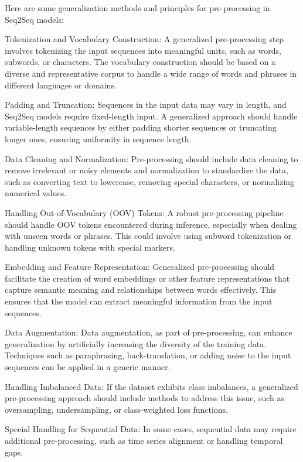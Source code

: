 \documentclass[conference]{IEEEtran}
\begin{document}
Here are some generalization methods and principles for pre-processing in Seq2Seq models:

    Tokenization and Vocabulary Construction: A generalized pre-processing step involves tokenizing the input sequences into meaningful units, such as words, subwords, or characters. The vocabulary construction should be based on a diverse and representative corpus to handle a wide range of words and phrases in different languages or domains.

    Padding and Truncation: Sequences in the input data may vary in length, and Seq2Seq models require fixed-length input. A generalized approach should handle variable-length sequences by either padding shorter sequences or truncating longer ones, ensuring uniformity in sequence length.

    Data Cleaning and Normalization: Pre-processing should include data cleaning to remove irrelevant or noisy elements and normalization to standardize the data, such as converting text to lowercase, removing special characters, or normalizing numerical values.

    Handling Out-of-Vocabulary (OOV) Tokens: A robust pre-processing pipeline should handle OOV tokens encountered during inference, especially when dealing with unseen words or phrases. This could involve using subword tokenization or handling unknown tokens with special markers.

    Embedding and Feature Representation: Generalized pre-processing should facilitate the creation of word embeddings or other feature representations that capture semantic meaning and relationships between words effectively. This ensures that the model can extract meaningful information from the input sequences.

    Data Augmentation: Data augmentation, as part of pre-processing, can enhance generalization by artificially increasing the diversity of the training data. Techniques such as paraphrasing, back-translation, or adding noise to the input sequences can be applied in a generic manner.

    Handling Imbalanced Data: If the dataset exhibits class imbalances, a generalized pre-processing approach should include methods to address this issue, such as oversampling, undersampling, or class-weighted loss functions.

    Special Handling for Sequential Data: In some cases, sequential data may require additional pre-processing, such as time series alignment or handling temporal gaps.
\end{document}
